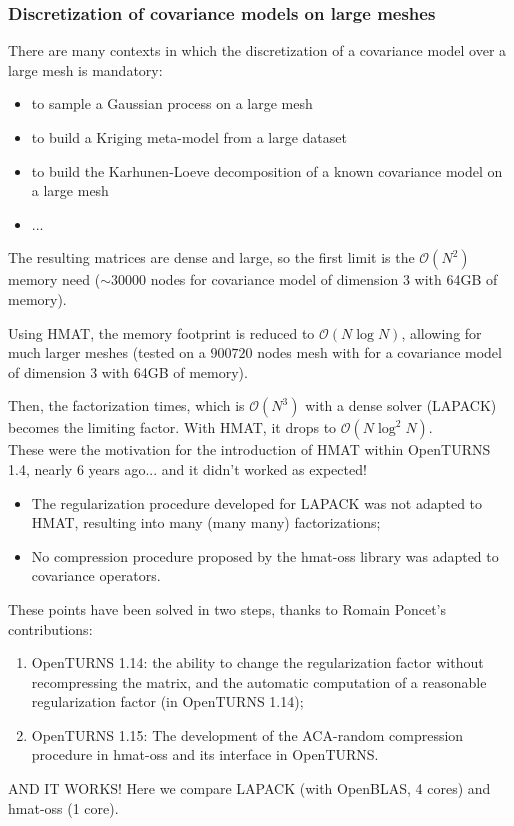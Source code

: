 \documentclass{beamer}
\begin{document}
\begin{frame}
\frametitle{Discretization of covariance models on large meshes}
There are many contexts in which the discretization of a covariance model over a large mesh is mandatory:
\begin{itemize}
\item to sample a Gaussian process on a large mesh
\item to build a Kriging meta-model from a large dataset
\item to build the Karhunen-Loeve decomposition of a known covariance model on a large mesh
\item ...
\end{itemize}
The resulting matrices are \alert{dense} and \alert{large}, so the first limit is the $\mathcal{O}(N^2)$ memory need ($\sim 30000$ nodes for covariance model of dimension 3 with 64GB of memory).

Using HMAT, the memory footprint is reduced to $\mathcal{O}(N\log N)$, allowing for much larger meshes (tested on a $900720$ nodes mesh with for a covariance model of dimension 3 with 64GB of memory).

Then, the factorization times, which is $\mathcal{O}(N^3)$ with a dense solver (LAPACK) becomes the limiting factor. With HMAT, it drops to $\mathcal{O}(N\log^2 N)$.\\[1em]

\alert{These were the motivation for the introduction of HMAT within OpenTURNS 1.4, nearly 6 years ago... and it didn't worked as expected!}\\[1em]

\begin{itemize}
\item The regularization procedure developed for LAPACK was not adapted to HMAT, resulting into many (many many) factorizations;
\item No compression procedure proposed by the hmat-oss library was adapted to covariance operators.
\end{itemize}

\newpage
These points have been solved in two steps, thanks to Romain Poncet's contributions:
\begin{enumerate}
\item OpenTURNS 1.14: the ability to change the regularization factor without recompressing the matrix, and the automatic computation of a reasonable regularization factor (in OpenTURNS 1.14);
\item OpenTURNS 1.15: The development of the \alert{ACA-random} compression procedure in hmat-oss and its interface in OpenTURNS.
\end{enumerate}

\alert{AND IT WORKS!} Here we compare LAPACK (with OpenBLAS, 4 cores) and hmat-oss (1 core).
\end{frame}
\end{document}
